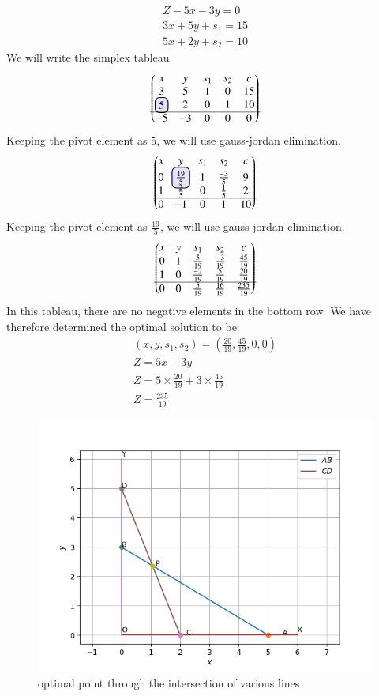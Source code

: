 \begin{align}
Z-5x-3y=0\\
3x+5y+s_1=15\\
5x+2y+s_2=10
\end{align}
We will write the simplex tableau
\begin{align}
\myvec{
 x & y & s_1 & s_2 & c  \\ 
  3 & 5 & 1 & 0 & 15 \\ 
  \hlight{5} & 2 & 0 & 1 & 10  \\ \hline
  -5 & -3 & 0 & 0 & 0 
}
\end{align}
Keeping the pivot element as $5$, we will use gauss-jordan elimination.
\begin{align}
\myvec{
  x & y & s_1 & s_2 & c  \\[0.1cm] 
  0 & \hlight{\frac{19}{5}} & 1 & \frac{-3}{5} & 9 \\
  1 & \frac{2}{5} & 0 & \frac{1}{5} & 2  \\ \hline
  0 & -1 & 0 & 1 & 10 
}
\end{align}
Keeping the pivot element as $\frac{19}{5}$, we will use gauss-jordan elimination.
\begin{align}
\begin{pmatrix}
  x & y & s_1 & s_2 & c  \\ 
  0 & 1 & \frac{5}{19} & \frac{-3}{19} & \frac{45}{19} \\ 
  1 & 0 & \frac{-2}{19} & \frac{5}{19} & \frac{20}{19}  \\ \hline 
  0 & 0 & \frac{5}{19} & \frac{16}{19} & \frac{235}{19} \\
\end{pmatrix}
\end{align}
In this tableau, there are no negative elements in the bottom row. We have therefore determined the optimal solution to be:
\begin{align}
(x,y,s_1,s_2)=\left(\frac{20}{19},\frac{45}{19},0,0\right)\\
Z=5x+3y\\
Z=5\times\frac{20}{19}+3\times\frac{45}{19}\\
Z=\frac{235}{19}
\end{align}
\begin{figure}[h]
\includegraphics[width=\columnwidth]{./solutions/4/5/Figure_1.png}
\caption{optimal point through the intersection of various lines}
\label{fig:Figure_1}
\end{figure}
